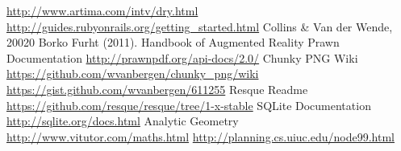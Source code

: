 \begin{thebibliography}{99999}
\singlespace\normalsize

 \url{http://www.artima.com/intv/dry.html}
 \url{http://guides.rubyonrails.org/getting_started.html}
 Collins \& Van der Wende, 20020
 Borko Furht (2011). Handbook of Augmented Reality
 Prawn Documentation \url{http://prawnpdf.org/api-docs/2.0/}
 Chunky PNG Wiki \url{https://github.com/wvanbergen/chunky_png/wiki}
 \url{https://gist.github.com/wvanbergen/611255}
 Resque Readme \url{https://github.com/resque/resque/tree/1-x-stable}
 SQLite Documentation \url{http://sqlite.org/docs.html}
 Analytic Geometry \url{http://www.vitutor.com/maths.html}
 \url{http://planning.cs.uiuc.edu/node99.html}


\end{thebibliography}